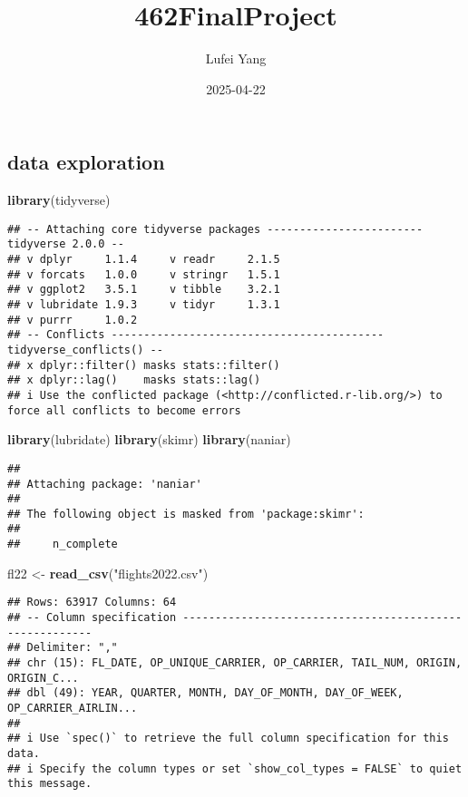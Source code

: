 \documentclass[
]{article}
\title{462FinalProject}
\author{Lufei Yang}
\date{2025-04-22}
\newenvironment{Shaded}{\begin{snugshade}}{\end{snugshade}}
\newcommand{\FunctionTok}[1]{\textcolor[rgb]{0.13,0.29,0.53}{\textbf{#1}}}
\newcommand{\NormalTok}[1]{#1}
\newcommand{\OtherTok}[1]{\textcolor[rgb]{0.56,0.35,0.01}{#1}}
\newcommand{\StringTok}[1]{\textcolor[rgb]{0.31,0.60,0.02}{#1}}
\begin{document}
\maketitle

\subsection{data exploration}\label{data-exploration}

\begin{Shaded}
\begin{Highlighting}[]
\FunctionTok{library}\NormalTok{(tidyverse)}
\end{Highlighting}
\end{Shaded}

\begin{verbatim}
## -- Attaching core tidyverse packages ------------------------ tidyverse 2.0.0 --
## v dplyr     1.1.4     v readr     2.1.5
## v forcats   1.0.0     v stringr   1.5.1
## v ggplot2   3.5.1     v tibble    3.2.1
## v lubridate 1.9.3     v tidyr     1.3.1
## v purrr     1.0.2     
## -- Conflicts ------------------------------------------ tidyverse_conflicts() --
## x dplyr::filter() masks stats::filter()
## x dplyr::lag()    masks stats::lag()
## i Use the conflicted package (<http://conflicted.r-lib.org/>) to force all conflicts to become errors
\end{verbatim}

\begin{Shaded}
\begin{Highlighting}[]
\FunctionTok{library}\NormalTok{(lubridate)}
\FunctionTok{library}\NormalTok{(skimr)}
\FunctionTok{library}\NormalTok{(naniar)}
\end{Highlighting}
\end{Shaded}

\begin{verbatim}
## 
## Attaching package: 'naniar'
## 
## The following object is masked from 'package:skimr':
## 
##     n_complete
\end{verbatim}

\begin{Shaded}
\begin{Highlighting}[]
\NormalTok{fl22 }\OtherTok{\textless{}{-}} \FunctionTok{read\_csv}\NormalTok{(}\StringTok{"flights2022.csv"}\NormalTok{)}
\end{Highlighting}
\end{Shaded}

\begin{verbatim}
## Rows: 63917 Columns: 64
## -- Column specification --------------------------------------------------------
## Delimiter: ","
## chr (15): FL_DATE, OP_UNIQUE_CARRIER, OP_CARRIER, TAIL_NUM, ORIGIN, ORIGIN_C...
## dbl (49): YEAR, QUARTER, MONTH, DAY_OF_MONTH, DAY_OF_WEEK, OP_CARRIER_AIRLIN...
## 
## i Use `spec()` to retrieve the full column specification for this data.
## i Specify the column types or set `show_col_types = FALSE` to quiet this message.
\end{verbatim}
\end{document}

